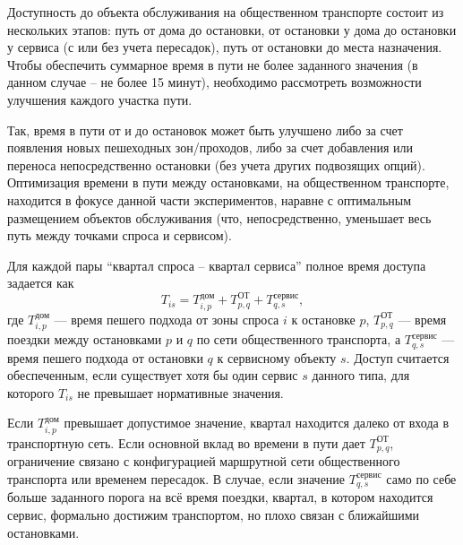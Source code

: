 Доступность до объекта обслуживания на общественном транспорте состоит из нескольких этапов: путь от дома до остановки, от остановки у дома до остановки у сервиса (с или без учета пересадок), путь от остановки до места назначения. Чтобы обеспечить суммарное время в пути не более заданного значения (в данном случае -- не более 15 минут), необходимо рассмотреть возможности улучшения каждого участка пути.

Так, время в пути от и до остановок может быть улучшено либо за счет появления новых пешеходных зон/проходов, либо за счет добавления или переноса непосредственно остановки (без учета других подвозящих опций). Оптимизация времени в пути между остановками, на общественном транспорте, находится в фокусе данной части экспериментов, наравне с оптимальным размещением объектов обслуживания (что, непосредственно, уменьшает весь путь между точками спроса и сервисом).





%

Для каждой пары ``квартал спроса -- квартал сервиса'' полное время доступа задается как
\[
T_{is}=T^{\text{дом}}_{i,p}+T^{\text{ОТ}}_{p,q}+T^{\text{сервис}}_{q,s},
\]
где $T^{\text{дом}}_{i,p}$ --- время пешего подхода от зоны спроса $i$ к остановке $p$, $T^{\text{ОТ}}_{p,q}$ --- время поездки между остановками $p$ и $q$ по сети общественного транспорта, а $T^{\text{сервис}}_{q,s}$ --- время пешего подхода от остановки $q$ к сервисному объекту $s$. Доступ считается обеспеченным, если существует хотя бы один сервис $s$ данного типа, для которого $T_{is}$ не превышает нормативные значения.

Если $T^{\text{дом}}_{i,p}$ превышает допустимое значение, квартал находится далеко от входа в транспортную сеть. Если основной вклад во времени в пути дает $T^{\text{ОТ}}_{p,q}$, ограничение связано с конфигурацией маршрутной сети общественного транспорта или временем пересадок. В случае, если значение $T^{\text{сервис}}_{q,s}$ само по себе больше заданного порога на всё время поездки, квартал, в котором находится сервис, формально достижим транспортом, но плохо связан с ближайшими остановками.

